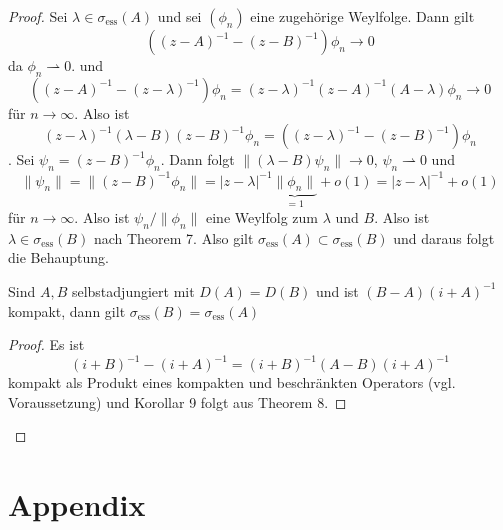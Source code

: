 \documentclass{mycourse}
\begin{document}
\begin{proof}
Sei $\lambda\in \sigma_{\text{ess}} (A)$ und sei $(\phi_n)$ eine zugehörige Weylfolge. Dann gilt
\[
((z-A)^{-1} - (z-B)^{-1})\phi_n \to 0
\]
da $\phi_n \rightharpoonup 0$. und
\[
((z-A)^{-1} - (z-\lambda)^{-1}) \phi_n = (z-\lambda)^{-1} (z-A)^{-1} (A- \lambda) \phi_n \to 0
\]
für $n\to \infty$. Also ist
\[
 (z-\lambda)^{-1} (\lambda- B) (z-B)^{-1} \phi_n = ((z-\lambda)^{-1} - (z-B)^{-1}) \phi_n 
\]
. Sei $\psi_n = (z-B)^{-1} \phi_n$. Dann folgt $\|(\lambda-B)\psi_n\| \to 0$, $\psi_n \rightharpoonup 0$ und
\[
\| \psi_n\| = \| (z- B)^{-1} \phi_n\| = |z-\lambda|^{-1} \underbrace{\| \phi_n \|}_{=1} + o(1)= |z-\lambda|^{-1} +o(1)
\]
für $n\to \infty$. Also ist $\psi_n/\|\phi_n\|$ eine Weylfolg zum $\lambda$ und $B$. Also ist $\lambda \in \sigma_{\text{ess}} (B)$ nach Theorem 7. Also gilt $\sigma_{\text{ess}}(A) \subset \sigma_{\text{ess}}(B)$ und daraus folgt die Behauptung.

\begin{kor}
Sind $A,B$ selbstadjungiert mit $D(A) = D(B)$ und ist $(B-A) (i+A)^{-1}$ kompakt, dann gilt $\sigma_{\text{ess}}(B) = \sigma_{\text{ess}}(A)$
\end{kor}
\begin{proof}
Es ist
\[
(i+B)^{-1} - (i+A)^{-1} = (i+B)^{-1} (A-B) (i+A)^{-1}
\]
kompakt als Produkt eines kompakten und beschränkten Operators (vgl. Voraussetzung) und Korollar 9 folgt aus Theorem 8. 
\end{proof}

\end{proof}







\appendix
\chapter{Appendix}
\end{document}
